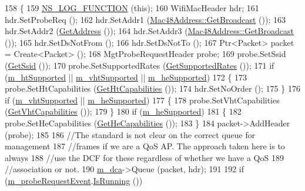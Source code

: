 \begin{DoxyCode}
158 \{
159   \hyperlink{log-macros-disabled_8h_a90b90d5bad1f39cb1b64923ea94c0761}{NS\_LOG\_FUNCTION} (\textcolor{keyword}{this});
160   WifiMacHeader hdr;
161   hdr.SetProbeReq ();
162   hdr.SetAddr1 (\hyperlink{classns3_1_1Mac48Address_a55156e302c6bf950c0b558365adbde84}{Mac48Address::GetBroadcast} ());
163   hdr.SetAddr2 (\hyperlink{classns3_1_1RegularWifiMac_aea719a7d05fbc664c50479fc900777b7}{GetAddress} ());
164   hdr.SetAddr3 (\hyperlink{classns3_1_1Mac48Address_a55156e302c6bf950c0b558365adbde84}{Mac48Address::GetBroadcast} ());
165   hdr.SetDsNotFrom ();
166   hdr.SetDsNotTo ();
167   Ptr<Packet> packet = Create<Packet> ();
168   MgtProbeRequestHeader probe;
169   probe.SetSsid (\hyperlink{classns3_1_1RegularWifiMac_a3cd4316ccd72111fa94f7091d4deb521}{GetSsid} ());
170   probe.SetSupportedRates (\hyperlink{classns3_1_1StaWifiMac_abe67dfa143223ed5237c4083bb474883}{GetSupportedRates} ());
171   \textcolor{keywordflow}{if} (\hyperlink{classns3_1_1RegularWifiMac_a8950c44b8cf2ad1f9274821cf88adc7b}{m\_htSupported} || \hyperlink{classns3_1_1RegularWifiMac_a151f330fdeb3f83f9ec7cf07537f0e86}{m\_vhtSupported} || 
      \hyperlink{classns3_1_1RegularWifiMac_a9458143c722fa0b6e5d223d41585842a}{m\_heSupported})
172     \{
173       probe.SetHtCapabilities (\hyperlink{classns3_1_1RegularWifiMac_ae2b0a52735a938a0f1ca233397ae2185}{GetHtCapabilities} ());
174       hdr.SetNoOrder ();
175     \}
176   \textcolor{keywordflow}{if} (\hyperlink{classns3_1_1RegularWifiMac_a151f330fdeb3f83f9ec7cf07537f0e86}{m\_vhtSupported} || \hyperlink{classns3_1_1RegularWifiMac_a9458143c722fa0b6e5d223d41585842a}{m\_heSupported})
177     \{
178       probe.SetVhtCapabilities (\hyperlink{classns3_1_1RegularWifiMac_ade487870f5663694d30a2dd6a7e614e8}{GetVhtCapabilities} ());
179     \}
180   \textcolor{keywordflow}{if} (\hyperlink{classns3_1_1RegularWifiMac_a9458143c722fa0b6e5d223d41585842a}{m\_heSupported})
181     \{
182       probe.SetHeCapabilities (\hyperlink{classns3_1_1RegularWifiMac_aea22761a20fdff9f6c1a9acc49d63700}{GetHeCapabilities} ());
183     \}
184   packet->AddHeader (probe);
185 
186   \textcolor{comment}{//The standard is not clear on the correct queue for management}
187   \textcolor{comment}{//frames if we are a QoS AP. The approach taken here is to always}
188   \textcolor{comment}{//use the DCF for these regardless of whether we have a QoS}
189   \textcolor{comment}{//association or not.}
190   \hyperlink{classns3_1_1RegularWifiMac_a152965c3def1a308b088b37c2c88a1a2}{m\_dca}->Queue (packet, hdr);
191 
192   \textcolor{keywordflow}{if} (\hyperlink{classns3_1_1StaWifiMac_a9794c3204b184f30fe9b920ac099c7c7}{m\_probeRequestEvent}.\hyperlink{classns3_1_1EventId_aabf8476d1a080c199ea0c6aa9ccea372}{IsRunning} ())

\end{DoxyCode}
